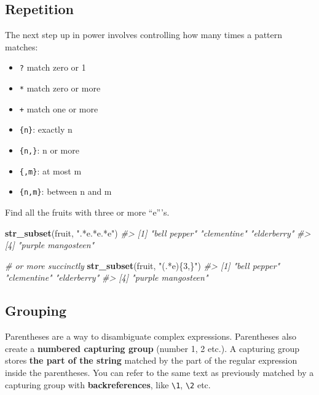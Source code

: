 \documentclass[]{book}
\newenvironment{Shaded}{\begin{snugshade}}{\end{snugshade}}
\newcommand{\KeywordTok}[1]{\textcolor[rgb]{0.13,0.29,0.53}{\textbf{#1}}}
\newcommand{\StringTok}[1]{\textcolor[rgb]{0.31,0.60,0.02}{#1}}
\newcommand{\CommentTok}[1]{\textcolor[rgb]{0.56,0.35,0.01}{\textit{#1}}}
\newcommand{\NormalTok}[1]{#1}
\providecommand{\tightlist}{%
  \setlength{\itemsep}{0pt}\setlength{\parskip}{0pt}}
\begin{document}
\subsection{Repetition}\label{repetition}

The next step up in power involves controlling how many times a pattern
matches:

\begin{itemize}
\tightlist
\item
  \texttt{?} match zero or 1
\item
  \texttt{*} match zero or more
\item
  \texttt{+} match one or more
\item
  \texttt{\{n\}}: exactly n
\item
  \texttt{\{n,\}}: n or more
\item
  \texttt{\{,m\}}: at most m
\item
  \texttt{\{n,m\}}: between n and m
\end{itemize}

Find all the fruits with three or more ``e'''s.

\begin{Shaded}
\begin{Highlighting}[]
\KeywordTok{str_subset}\NormalTok{(fruit, }\StringTok{".*e.*e.*e"}\NormalTok{) }
\CommentTok{#> [1] "bell pepper"       "clementine"        "elderberry"       }
\CommentTok{#> [4] "purple mangosteen"}

\CommentTok{# or more succinctly}
\KeywordTok{str_subset}\NormalTok{(fruit, }\StringTok{"(.*e)\{3,\}"}\NormalTok{)}
\CommentTok{#> [1] "bell pepper"       "clementine"        "elderberry"       }
\CommentTok{#> [4] "purple mangosteen"}
\end{Highlighting}
\end{Shaded}

\subsection{Grouping}\label{grouping}

Parentheses are a way to disambiguate complex expressions. Parentheses
also create a \textbf{numbered capturing group} (number 1, 2 etc.). A
capturing group stores \textbf{the part of the string} matched by the
part of the regular expression inside the parentheses. You can refer to
the same text as previously matched by a capturing group with
\textbf{backreferences}, like \texttt{\textbackslash{}1},
\texttt{\textbackslash{}2} etc.
\end{document}
